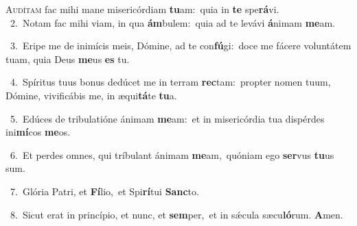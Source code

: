 \lettrine{\initial\textcolor{\initialcolor}{A}}{udítam} fac mihi mane misericórdiam \textbf{tu}\-am:~\star quia in \textbf{te} spe\-\textbf{rá}\-vi.\\
{\numbfont\textcolor{\numbcolor}{~2.}}~Notam fac mihi viam, in qua \textbf{ám}\-bulem:~\star quia ad te levávi \textbf{á}\-nimam \textbf{me}\-am.\par
{\numbfont\textcolor{\numbcolor}{~3.}}~Eripe me de inimícis meis, Dómine, ad te con\-\textbf{fú}\-gi:~\star doce me fácere voluntátem tuam, quia Deus \textbf{me}\-us \textbf{es} tu.\par
{\numbfont\textcolor{\numbcolor}{~4.}}~Spíritus tuus bonus dedúcet me in terram \textbf{rec}\-tam:~\star propter nomen tuum, Dómine, vivificábis me, in æqui\-\textbf{tá}\-te \textbf{tu}\-a.\par
{\numbfont\textcolor{\numbcolor}{~5.}}~Edúces de tribulatióne ánimam \textbf{me}\-am:~\star et in misericórdia tua dispérdes ini\-\textbf{mí}\-cos \textbf{me}\-os.\par
{\numbfont\textcolor{\numbcolor}{~6.}}~Et perdes omnes, qui tríbulant ánimam \textbf{me}\-am,~\star quóniam ego \textbf{ser}\-vus \textbf{tu}\-us sum.\par
{\numbfont\textcolor{\numbcolor}{~7.}}~Glória Patri, et \textbf{Fí}\-lio,~\star et Spi\-\textbf{rí}\-tui \textbf{Sanc}\-to.\par
{\numbfont\textcolor{\numbcolor}{~8.}}~Sicut erat in princípio, et nunc, et \textbf{sem}\-per,~\star et in sǽcula sæcu\-\textbf{ló}\-rum. \textbf{A}\-men.\par
